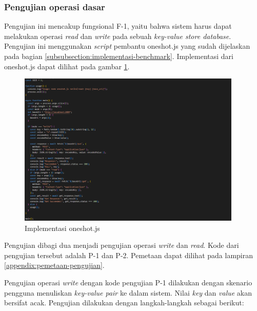 \subsubsection{Pengujian operasi dasar}
\label{subsubsection:pengujian-operasi-dasar}

Pengujian ini mencakup fungsional F-1, yaitu bahwa sistem harus dapat melakukan operasi \textit{read} dan \textit{write} pada sebuah \textit{key-value store database}. Pengujian ini menggunakan \textit{script} pembantu oneshot.js yang sudah dijelaskan pada bagian \ref{subsubsection:implementasi-benchmark}. Implementasi dari oneshot.js dapat dilihat pada gambar \ref{fig:implementasi-oneshot}. 

\begin{figure}[ht]
    \centering
    \includegraphics[width=0.95\textwidth]{resources/chapter-4/oneshot.png}
    \caption{Implementasi oneshot.js}
    \label{fig:implementasi-oneshot}
\end{figure}

Pengujian dibagi dua menjadi pengujian operasi \textit{write} dan \textit{read}. Kode dari pengujian tersebut adalah P-1 dan P-2. Pemetaan dapat dilihat pada lampiran \ref{appendix:pemetaan-pengujian}.

Pengujian operasi \textit{write} dengan kode pengujian P-1 dilakukan dengan skenario pengguna menuliskan \textit{key-value pair} ke dalam sistem. Nilai \textit{key} dan \textit{value} akan bersifat acak. Pengujian dilakukan dengan langkah-langkah sebagai berikut:

